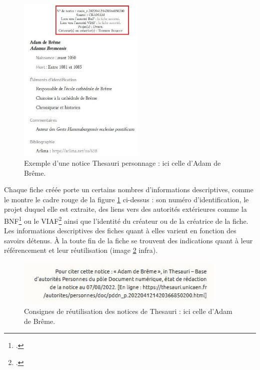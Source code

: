 \documentclass[a4paper,12pt,twoside]{book}
\begin{document}
\begin{figure}[H]
    \centering
    \includegraphics[width=6cm]{img/partie_3/thesau_breme.JPG}
    \caption{Exemple d'une notice Thesauri personnage : ici celle d'Adam de Brême.}
    \label{thesau_breme}
\end{figure}


Chaque fiche créée porte un certains nombres d'informations descriptives, comme le montre le cadre rouge de la figure \ref{thesau_breme} ci-dessus : son numéro d'identification, le projet duquel elle est extraite, des liens vers des autorités extérieures comme la \acrshort{BNF}\footcite{bnf} ou le \acrshort{VIAF}\footcite{viaf} ainsi que l'identité du créateur ou de la créatrice de la fiche. Les informations descriptives des fiches quant à elles varient en fonction des savoirs détenus. À la toute fin de la fiche se trouvent des indications quant à leur référencement et leur réutilisation (image \ref{cit_notice} infra).

\begin{figure}[H]
    \centering
    \includegraphics[width=10cm]{img/partie_3/cit_notice.JPG}
    \caption{Consignes de réutilisation des notices de Thesauri : ici celle d'Adam de Brême.}
    \label{cit_notice}
\end{figure}
\end{document}
